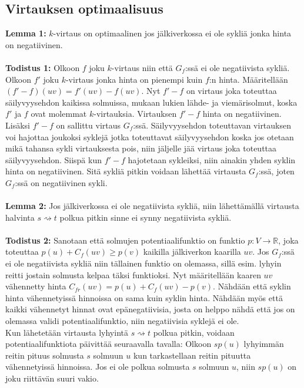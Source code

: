 \documentclass[a4paper, 11pt]{article}
\begin{document}
\subsection*{Virtauksen optimaalisuus}
\textbf{Lemma 1:} $k$-virtaus on optimaalinen jos jälkiverkossa ei ole sykliä jonka
hinta on negatiivinen.\\\\
\noindent
\textbf{Todistus 1:} Olkoon $f$ joku $k$-virtaus niin että $G_f$:ssä ei ole negatiivista
sykliä. Olkoon $f'$ joku $k$-virtaus jonka hinta on pienempi kuin $f$:n hinta. Määritellään
$(f' - f)(uv) = f'(uv) - f(uv)$. Nyt $f' - f$ on virtaus joka toteuttaa säilyvyysehdon kaikissa 
solmuissa, mukaan lukien lähde- ja viemärisolmut, koska $f'$ ja $f$ ovat molemmat $k$-virtauksia.
Virtauksen $f' - f$ hinta on negatiivinen. Lisäksi $f' - f$ on sallittu
virtaus $G_f$:ssä. Säilyvyysehdon toteuttavan virtauksen voi hajottaa joukoksi syklejä
jotka toteuttavat säilyvyysehdon koska jos otetaan mikä tahansa
sykli virtauksesta pois, niin jäljelle jää virtaus joka toteuttaa säilyvyysehdon.
Siispä kun $f' - f$ hajotetaan sykleiksi, niin ainakin yhden syklin hinta on negatiivinen.
Sitä sykliä pitkin voidaan lähettää virtausta $G_f$:ssä, joten $G_f$:ssä on negatiivinen sykli.\\\\
\noindent
\textbf{Lemma 2:} Jos jälkiverkossa ei ole negatiivista sykliä, niin lähettämällä virtausta
halvinta $s \rightsquigarrow t$ polkua pitkin sinne ei synny negatiivista sykliä.\\\\
\noindent
\textbf{Todistus 2:} Sanotaan että solmujen potentiaalifunktio on funktio 
$p: V \rightarrow \mathbb{R}$, joka toteuttaa
$p(u) + C_f(uv) \ge p(v)$ kaikilla jälkiverkon kaarilla $uv$. Jos $G_f$:ssä ei ole 
negatiivista sykliä niin tällainen 
funktio on olemassa, sillä esim. lyhyin reitti jostain solmusta kelpaa täksi funktioksi.
Nyt määritellään kaaren $uv$ vähennetty hinta $C_{fr}(uv) = p(u) + C_f(uv) - p(v)$.
Nähdään että syklin hinta vähennetyissä hinnoissa on sama kuin syklin hinta. Nähdään myös
että kaikki vähennetyt hinnat ovat epänegatiivisia, josta on helppo nähdä että jos on
olemassa validi potentiaalifunktio, niin negatiivisia syklejä ei ole.\\
Kun lähetetään virtausta lyhyintä $s \rightsquigarrow t$ polkua pitkin, voidaan
potentiaalifunktiota päivittää seuraavalla tavalla: Olkoon $sp(u)$ lyhyimmän reitin pituus
solmusta $s$ solmuun $u$ kun tarkastellaan reitin pituutta vähennetyissä hinnoissa.
Jos ei ole polkua solmusta $s$ solmuun $u$, niin $sp(u)$ on joku riittävän suuri vakio.
\end{document}
